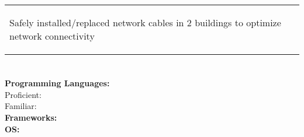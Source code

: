 \documentclass[a4paper]{modernsimplecv}
\begin{document}
\begin{paracol}{2}
\begin{minipage}[t]{\leftcolwidth}
\begin{tabular}{@{\raggedright}p{} |>{\raggedright\arraybackslash}p{}}
{\begin{tabitemize}
                    \item Safely installed/replaced network cables in 2 buildings to optimize network connectivity
                \end{tabitemize}
                \vspace{-\baselineskip}\mbox{}
                }
        \end{tabular}
        \vspace{1em}
    \end{minipage}

    \switchcolumn

    \begin{minipage}[t]{\rightcolwidth}
        \vspace{1em}
        \section*{}
        \begin{minipage}[t]{\textwidth}
            \raggedright
            {\normalsize\textbf{Programming Languages:}}\\
            Proficient:     
               \\
            Familiar:    
              
             \\
            {\normalsize\textbf{Frameworks: }}
               \\
            {\normalsize\textbf{OS: }}
              
        \end{minipage}


\end{minipage}
\end{paracol}
\end{document}
